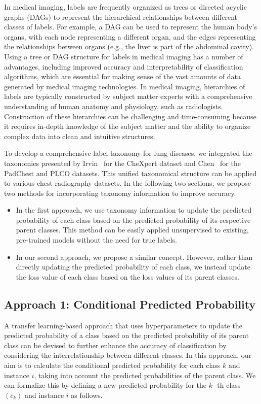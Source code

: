 In medical imaging, labels are frequently organized as trees or directed acyclic graphs (DAGs) to represent the hierarchical relationships between different classes of labels. For example, a DAG can be used to represent the human body's organs, with each node representing a different organ, and the edges representing the relationships between organs (e.g., the liver is part of the abdominal cavity). Using a tree or DAG structure for labels in medical imaging has a number of advantages, including improved accuracy and interpretability of classification algorithms, which are essential for making sense of the vast amounts of data generated by medical imaging technologies. In medical imaging, hierarchies of labels are typically constructed by subject matter experts with a comprehensive understanding of human anatomy and physiology, such as radiologists. Construction of these hierarchies can be challenging and time-consuming because it requires in-depth knowledge of the subject matter and the ability to organize complex data into clean and intuitive structures.

To develop a comprehensive label taxonomy for lung diseases, we integrated the taxonomies presented by Irvin~\cite{irvin_CheXpert_2019} for the CheXpert dataset and Chen~\cite{chen_Deep_2020} for the PadChest and PLCO datasets. This unified taxonomical structure can be applied to various chest radiography datasets. In the following two sections, we propose two methods for incorporating taxonomy information to improve accuracy.

\begin{itemize}
    \item In the first approach, we use taxonomy information to update the predicted probability of each class based on the predicted probability of its respective parent classes. This method can be easily applied unsupervised to existing, pre-trained models without the need for true labels.

    \item  In our second approach, we propose a similar concept. However, rather than directly updating the predicted probability of each class, we instead update the loss value of each class based on the loss values of its parent classes.
\end{itemize}

\subsection{Approach 1: Conditional Predicted Probability}
A transfer learning-based approach that uses hyperparameters to update the predicted probability of a class based on the predicted probability of its parent class can be devised to further enhance the accuracy of classification by considering the interrelationship between different classes. In this approach, our aim is to calculate the conditional predicted probability for each class $k $ and instance $i $, taking into account the predicted probabilities of the parent class. We can formalize this by defining a new predicted probability for the $k $ -th class $(c_k) $ and instance $i $ as follows.

